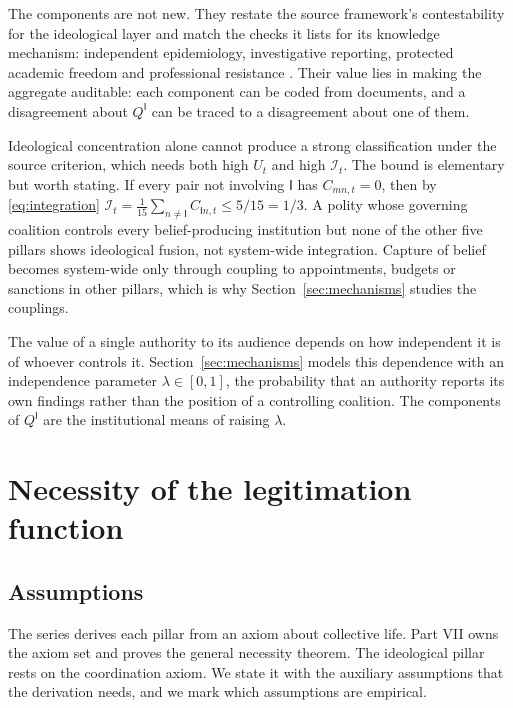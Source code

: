 \documentclass[11pt,letterpaper]{article}
\theoremstyle{definition}
\theoremstyle{remark}
\newcommand{\pI}{\mathsf{I}}
\newcommand{\Int}{\mathcal{I}}
\begin{document}
The components are not new. They restate the source framework's contestability for the ideological layer and match the checks it lists for its knowledge mechanism: independent epidemiology, investigative reporting, protected academic freedom and professional resistance \citep{largo2026hbs}. Their value lies in making the aggregate auditable: each component can be coded from documents, and a disagreement about $Q^{\pI}$ can be traced to a disagreement about one of them.

Ideological concentration alone cannot produce a strong classification under the source criterion, which needs both high $U_t$ and high $\Int_t$. The bound is elementary but worth stating. If every pair not involving $\pI$ has $C_{mn,t}=0$, then by \eqref{eq:integration} $\Int_t=\frac{1}{15}\sum_{n\neq\pI}C_{\pI n,t}\leq 5/15=1/3$. A polity whose governing coalition controls every belief-producing institution but none of the other five pillars shows ideological fusion, not system-wide integration. Capture of belief becomes system-wide only through coupling to appointments, budgets or sanctions in other pillars, which is why Section~\ref{sec:mechanisms} studies the couplings.

The value of a single authority to its audience depends on how independent it is of whoever controls it. Section~\ref{sec:mechanisms} models this dependence with an independence parameter $\lambda\in[0,1]$, the probability that an authority reports its own findings rather than the position of a controlling coalition. The components of $Q^{\pI}$ are the institutional means of raising $\lambda$.

\section{Necessity of the legitimation function}
\label{sec:necessity}

\subsection{Assumptions}

The series derives each pillar from an axiom about collective life. Part VII owns the axiom set and proves the general necessity theorem. The ideological pillar rests on the coordination axiom. We state it with the auxiliary assumptions that the derivation needs, and we mark which assumptions are empirical.
\end{document}
